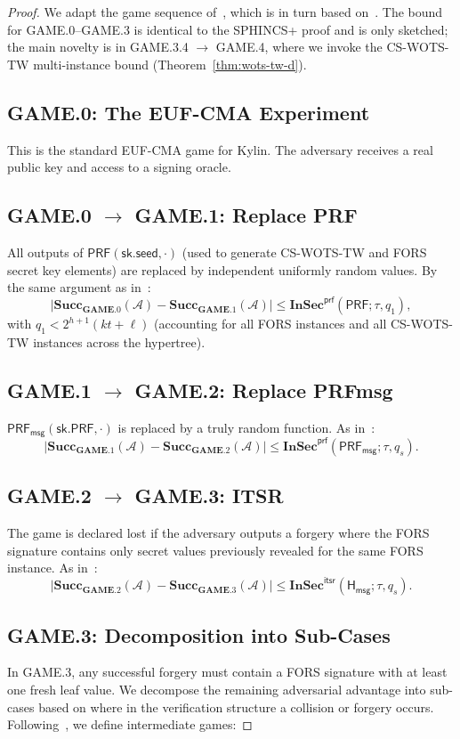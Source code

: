 \documentclass[11pt,a4paper]{article}
\newcommand{\sk}{\mathsf{sk}}
\newcommand{\seed}{\mathsf{seed}}
\newcommand{\PRF}{\mathsf{PRF}}
\newcommand{\PRFmsg}{\mathsf{PRF}_{\mathsf{msg}}}
\newcommand{\Hmsg}{\mathsf{H}_{\mathsf{msg}}}
\newcommand{\InSec}[1]{\mathbf{InSec}^{\mathsf{#1}}}
\newcommand{\Succ}{\mathbf{Succ}}
\newcommand{\GAME}{\mathbf{GAME}}
\newcommand{\prf}{\mathsf{PRF}}
\begin{document}
\begin{proof}
We adapt the game sequence of~\cite[Theorem~3]{HK22}, which is in turn based on~\cite[Theorem~17]{BHK+19}. The bound for GAME.0--GAME.3 is identical to the SPHINCS+ proof and is only sketched; the main novelty is in GAME.3.4 $\to$ GAME.4, where we invoke the CS-WOTS-TW multi-instance bound (Theorem~\ref{thm:wots-tw-d}).

\subsection*{GAME.0: The EUF-CMA Experiment}
This is the standard EUF-CMA game for Kylin. The adversary receives a real public key and access to a signing oracle.

\subsection*{GAME.0 $\to$ GAME.1: Replace PRF}
All outputs of $\PRF(\sk.\seed,\cdot)$ (used to generate CS-WOTS-TW and FORS secret key elements) are replaced by independent uniformly random values. By the same argument as in~\cite[Eq.~(4)]{HK22}:
\[
|\Succ_{\GAME.0}(\mathcal{A}) - \Succ_{\GAME.1}(\mathcal{A})| \le \InSec{prf}(\PRF; \tau, q_1),
\]
with $q_1 < 2^{h+1}(kt + \ell)$ (accounting for all FORS instances and all CS-WOTS-TW instances across the hypertree).

\subsection*{GAME.1 $\to$ GAME.2: Replace PRFmsg}
$\PRFmsg(\sk.\prf,\cdot)$ is replaced by a truly random function. As in~\cite[Eq.~(5)]{HK22}:
\[
|\Succ_{\GAME.1}(\mathcal{A}) - \Succ_{\GAME.2}(\mathcal{A})| \le \InSec{prf}(\PRFmsg; \tau, q_s).
\]

\subsection*{GAME.2 $\to$ GAME.3: ITSR}
The game is declared lost if the adversary outputs a forgery where the FORS signature contains only secret values previously revealed for the same FORS instance. As in~\cite[Eq.~(6)]{HK22}:
\[
|\Succ_{\GAME.2}(\mathcal{A}) - \Succ_{\GAME.3}(\mathcal{A})| \le \InSec{itsr}(\Hmsg; \tau, q_s).
\]

\subsection*{GAME.3: Decomposition into Sub-Cases}
In GAME.3, any successful forgery must contain a FORS signature with at least one fresh leaf value. We decompose the remaining adversarial advantage into sub-cases based on where in the verification structure a collision or forgery occurs. Following~\cite{HK22}, we define intermediate games:


\end{proof}
\end{document}
